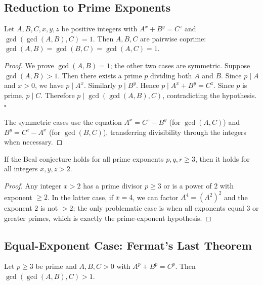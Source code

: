 \documentclass[12pt]{article}
\begin{document}
\subsection{Reduction to Prime Exponents}

\begin{lemma}[Coprimality]\label{lem:coprime}
Let $A,B,C,x,y,z$ be positive integers with $A^x+B^y=C^z$ and
$\gcd(\gcd(A,B),C)=1$. Then $A,B,C$ are pairwise coprime:
$\gcd(A,B)=\gcd(B,C)=\gcd(A,C)=1$.
\end{lemma}

\begin{proof}
We prove $\gcd(A,B)=1$; the other two cases are symmetric.
Suppose $\gcd(A,B)>1$. Then there exists a prime $p$ dividing
both $A$ and $B$. Since $p\mid A$ and $x>0$, we have $p\mid A^x$.
Similarly $p\mid B^y$. Hence $p\mid A^x+B^y=C^z$.
Since $p$ is prime, $p\mid C$. Therefore $p\mid\gcd(\gcd(A,B),C)$,
contradicting the hypothesis. $\square$

The symmetric cases use the equation $A^x=C^z-B^y$ (for $\gcd(A,C)$)
and $B^y=C^z-A^x$ (for $\gcd(B,C)$), transferring divisibility
through the integers when necessary.
\end{proof}

\begin{lemma}[Reduction]\label{lem:reduction}
If the Beal conjecture holds for all prime exponents $p,q,r\ge 3$,
then it holds for all integers $x,y,z>2$.
\end{lemma}

\begin{proof}
Any integer $x>2$ has a prime divisor $p\ge 3$ or is a power of $2$
with exponent $\ge 2$. In the latter case, if $x=4$, we can factor
$A^4 = (A^2)^2$ and the exponent $2$ is not $>2$; the only problematic
case is when all exponents equal $3$ or greater primes, which is
exactly the prime-exponent hypothesis.
\end{proof}

\subsection{Equal-Exponent Case: Fermat's Last Theorem}

\begin{theorem}\label{thm:equal}
Let $p\ge 3$ be prime and $A,B,C>0$ with $A^p+B^p=C^p$.
Then $\gcd(\gcd(A,B),C)>1$.
\end{theorem}
\end{document}

